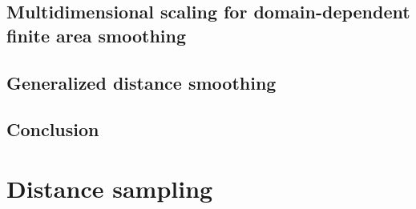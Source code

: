 \documentclass[12pt]{report}
\begin{document}


\chapter{Multidimensional scaling for domain-dependent finite area smoothing}



\chapter{Generalized distance smoothing}
%



\chapter{Conclusion}


\part{Distance sampling}
\end{document}
